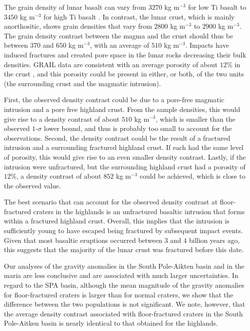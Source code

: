 The grain density of lunar basalt can vary from $3270$ kg m$^{-3}$ for
low   Ti  basalt   to  $3450$   kg   m$^{-3}$  for   high  Ti   basalt
\citep{Kiefer:2012kp}.  In contrast, the  lunar crust, which is mainly
anorthositic, shows grain densities that  vary from $2800$ kg m$^{-3}$
to $ 2900$  kg m$^{-3}$. The grain density contrast  between the magma
and the crust should thus be between $370$ and $650$ kg m$^{-3}$, with
an average  of $510$ kg  m$^{-3}$. Impacts have induced  fractures and
created pore space in the lunar rocks decreasing their bulk densities.
GRAIL data are consistent with an  average porosity of about $12\%$ in
the  crust  \citep{Wieczorek:2013ipa},  and  this  porosity  could  be
present in  either, or both, of  the two units (the  surrounding crust
and the magmatic intrusion).

First,  the observed  density contrast  could  be due  to a  pore-free
magmatic intrusion  and a  pore free highland  crust. From  the sample
densities, this would  give rise to a density contrast  of about $510$
kg m$^{-3}$,  which is  smaller than  the observed  $1$-$\sigma$ lower
bound, and thus is probably too small to account for the observations.
Second,  the density  contrast  could  be the  result  of a  fractured
intrusion and  a surrounding fractured  highland crust.  If  each had
the same  level of porosity, this  would give rise to  an even smaller
density contrast.  Lastly, if the  intrusion were unfractured, but the
surrounding  highland  crust  had  a porosity  of  $12\%$,  a  density
contrast of about $852$ kg m$^{-3}$  could be achieved, which is close
to the observed value.

The best scenario  that can account for the  observed density contrast
at floor-fractured craters in the highlands is an unfractured basaltic
intrusion that forms within a fractured highland crust.  Overall, this
implies that the intrusion is sufficiently young to have escaped being
fractured  by  subsequent impact  events.   Given  that most  basaltic
eruptions  occurred  between  $3$  and $4$  billion  years  ago,  this
suggests that  the majority  of the lunar  crust was  fractured before
this date.

Our analyses of  the gravity anomalies in the  South Pole-Aikten basin
and in  the maria  are less  conclusive and  are associated  with much
larger uncertainties.  In  regard to the SPA basin,  although the mean
magnitude  of the  gravity  anomalies for  floor-fractured craters  is
larger than  for normal craters,  we show that the  difference between
the two  populations is not  significant.  We note, however,  that the
average density  contrast associated  with floor-fractured  craters in
the South Pole-Aitken  basin is nearly identical to  that obtained for
the highlands.

